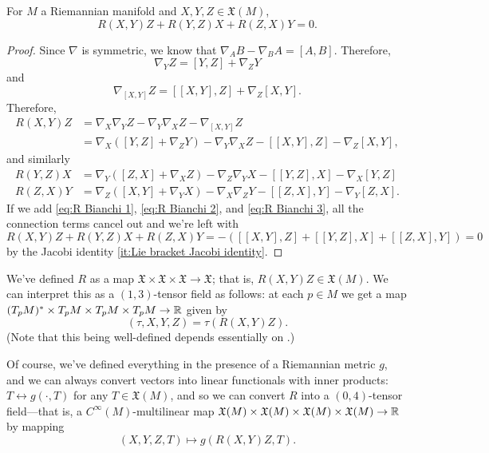 \begin{proposition}\label{prop:Bianchi identity}
	For $M$ a Riemannian manifold and $X,Y,Z \in \mathfrak{X}(M)$,
	\[
		R(X,Y)Z + R(Y,Z)X + R(Z,X)Y = 0.
	\]
\end{proposition}

\begin{proof}
	Since $\nabla$ is symmetric, we know that $\nabla_AB - \nabla_B A = [A,B]$. Therefore, 
	\[
		\nabla_YZ = [Y,Z] + \nabla_ZY
	\]
	and
	\[
		\nabla_{[X,Y]}Z = [[X,Y],Z] + \nabla_Z[X,Y].
	\]
	Therefore,
	\begin{align}\label{eq:R Bianchi 1}
		R(X,Y)Z & = \nabla_X \nabla_Y Z - \nabla_Y \nabla_X Z - \nabla_{[X,Y]}Z \nonumber\\
		& = \nabla_X([Y,Z] + \nabla_ZY) - \nabla_Y \nabla_XZ - [[X,Y],Z] - \nabla_Z[X,Y],
	\end{align}
	and similarly
	\begin{align}
		R(Y,Z)X & = \nabla_Y([Z,X] + \nabla_XZ) - \nabla_Z \nabla_YX - [[Y,Z],X] - \nabla_X[Y,Z] \label{eq:R Bianchi 2} \\
		R(Z,X)Y & = \nabla_Z([X,Y] + \nabla_YX) - \nabla_X \nabla_ZY - [[Z,X],Y] - \nabla_Y[Z,X]. \label{eq:R Bianchi 3}
	\end{align}
	If we add \eqref{eq:R Bianchi 1}, \eqref{eq:R Bianchi 2}, and \eqref{eq:R Bianchi 3}, all the connection terms cancel out and we're left with
	\[
		R(X,Y)Z + R(Y,Z)X + R(Z,X)Y = -([[X,Y],Z] + [[Y,Z],X] + [[Z,X],Y]) = 0
	\]
	by the Jacobi identity \ref{it:Lie bracket Jacobi identity}.
\end{proof}

We've defined $R$ as a map $\mathfrak{X} \times \mathfrak{X} \times \mathfrak{X} \to \mathfrak{X}$; that is, $R(X,Y)Z \in \mathfrak{X}(M)$. We can interpret this as a $(1,3)$-tensor field as follows: at each $p \in M$ we get a map $(T_pM)^\ast \times T_pM \times T_pM \times T_pM \to \mathbb{R}$ given by
\[
	(\tau,X,Y,Z) = \tau(R(X,Y)Z).
\]
(Note that this being well-defined depends essentially on .)

Of course, we've defined everything in the presence of a Riemannian metric $g$, and we can always convert vectors into linear functionals with inner products: $T \leftrightarrow g(\cdot, T)$ for any $T \in \mathfrak{X}(M)$, and so we can convert $R$ into a $(0,4)$-tensor field—that is, a $C^\infty(M)$-multilinear map $\mathfrak{X}(M) \times \mathfrak{X}(M) \times \mathfrak{X}(M) \times \mathfrak{X}(M) \to \mathbb{R}$ by mapping
\[
	(X,Y,Z,T) \mapsto g(R(X,Y)Z,T).
\]

